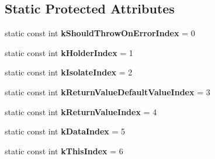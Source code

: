 \subsection*{Static Protected Attributes}
\begin{DoxyCompactItemize}
\item 
static const int {\bfseries k\+Should\+Throw\+On\+Error\+Index} = 0\hypertarget{classv8_1_1_property_callback_info_aab5f05fed930b0cad97ed7f96520f60e}{}\label{classv8_1_1_property_callback_info_aab5f05fed930b0cad97ed7f96520f60e}

\item 
static const int {\bfseries k\+Holder\+Index} = 1\hypertarget{classv8_1_1_property_callback_info_a8598985473483dfadba4e4c67251675b}{}\label{classv8_1_1_property_callback_info_a8598985473483dfadba4e4c67251675b}

\item 
static const int {\bfseries k\+Isolate\+Index} = 2\hypertarget{classv8_1_1_property_callback_info_a59ba899cb580bc5e8adca6f799db3e2a}{}\label{classv8_1_1_property_callback_info_a59ba899cb580bc5e8adca6f799db3e2a}

\item 
static const int {\bfseries k\+Return\+Value\+Default\+Value\+Index} = 3\hypertarget{classv8_1_1_property_callback_info_a00849f770023891d1466176f5e0c8539}{}\label{classv8_1_1_property_callback_info_a00849f770023891d1466176f5e0c8539}

\item 
static const int {\bfseries k\+Return\+Value\+Index} = 4\hypertarget{classv8_1_1_property_callback_info_ae16cdf2c6ce787b21d94953cd514ed0e}{}\label{classv8_1_1_property_callback_info_ae16cdf2c6ce787b21d94953cd514ed0e}

\item 
static const int {\bfseries k\+Data\+Index} = 5\hypertarget{classv8_1_1_property_callback_info_a39fc5d6aaccb2916af503c7120ab99c5}{}\label{classv8_1_1_property_callback_info_a39fc5d6aaccb2916af503c7120ab99c5}

\item 
static const int {\bfseries k\+This\+Index} = 6\hypertarget{classv8_1_1_property_callback_info_a715d28b9c57a581de1698673c9b9eb8a}{}\label{classv8_1_1_property_callback_info_a715d28b9c57a581de1698673c9b9eb8a}

\end{DoxyCompactItemize}
